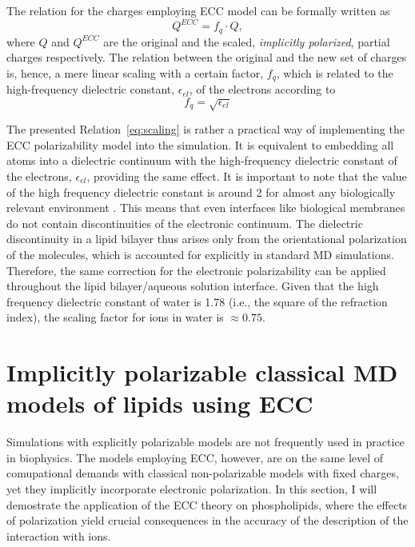 The relation for the charges employing ECC model can be formally written as
\begin{equation}  \label{eq:scaling}
 Q^{ECC} = f_q \cdot Q ,
\end{equation} 
where $Q$ and $Q^{ECC}$ are the original and the scaled, \emph{implicitly polarized}, partial charges respectively. 
The relation between the original and the new set of charges 
is, hence, a mere linear scaling with a certain factor, $f_q$, 
which is related to the high-frequency dielectric constant, $\epsilon _{el}$, of the electrons according to
\begin{equation}   \label{eq:scaling_factor}
 f_q = \sqrt{ \epsilon _{el} }
\end{equation} 

The presented Relation~\ref{eq:scaling} is rather a practical way of implementing the ECC polarizability model into the simulation. 
It is equivalent to embedding all atoms into a dielectric continuum 
with the high-frequency dielectric constant of the electrons, $\epsilon _{el}$, providing the same effect.
It is important to note that the value of the high frequency dielectric constant  
is around 2 for almost any biologically relevant environment \citep{leontyev11}. 
This means that even interfaces like biological membranes do not contain discontinuities of the electronic continuum. 
The dielectric discontinuity in a lipid bilayer thus arises only 
from the orientational polarization of the molecules, which is accounted for explicitly in standard MD simulations.  
Therefore, the same correction for the electronic polarizability can be  
applied throughout the lipid bilayer/aqueous solution interface. 
Given that the  high frequency dielectric constant of water is 1.78 (i.e., the square of the refraction index), 
the scaling factor for ions in water is $\approx 0.75$. 





 

 
 



\section{Implicitly polarizable classical MD models of lipids using ECC}
\label{section:ecc-lipids}

Simulations with explicitly polarizable models are not frequently used in practice in biophysics. 
The models employing ECC, however, are on the same level of comupational demands with classical non-polarizable models with fixed charges, yet they implicitly incorporate electronic polarization. 
In this section, I will demostrate the application of the ECC theory on phospholipids, 
where the effects of polarization yield crucial consequences in the accuracy of the description of the interaction with ions. 

